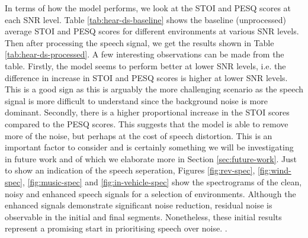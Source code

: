 \documentclass[logo,bsc,singlespacing,parskip,online]{infthesis}
\begin{document}
In terms of how the model performs, we look at the STOI and PESQ scores at each SNR level.
Table \ref{tab:hear-ds-baseline} shows the baseline (unprocessed) average STOI and PESQ scores for different environments at various SNR levels.
Then after processing the speech signal, we get the results shown in Table \ref{tab:hear-ds-processed}.
A few interesting observations can be made from the table. Firstly, the model 
seems to perform better at lower SNR levels, i.e. 
the difference in increase in STOI and PESQ scores is higher at lower SNR levels.
This is a good sign as this is arguably the more challenging scenario 
as the speech signal is more difficult to understand since the background noise 
is more dominant. Secondly, there is a higher proportional increase in the STOI 
scores compared to the PESQ scores. This suggests that the model is able 
to remove more of the noise, but perhaps at the cost of speech distortion. 
This is an important factor to consider and is certainly something we 
will be investigating in future work and of which we elaborate more in Section \ref{sec:future-work}.
Just to show an indication of the speech seperation, Figures \ref{fig:rev-spec}, \ref{fig:wind-spec}, \ref{fig:music-spec} and \ref{fig:in-vehicle-spec}
show the spectrograms of the clean, noisy and enhanced speech signals for a selection of environments.
Although the enhanced signals demonstrate significant noise reduction, residual noise is 
observable in the initial and final segments. Nonetheless, these initial results 
represent a promising start in prioritising speech over noise.
.
\end{document}
